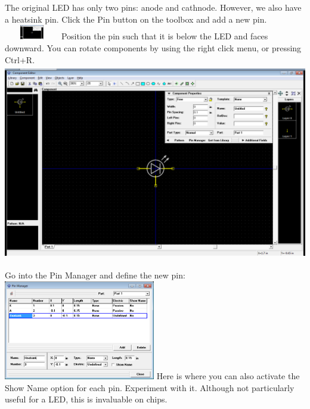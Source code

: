 \documentclass[letterpaper]{article}
\begin{document}
{\sffamily\color[rgb]{0.30980393,0.5058824,0.7411765}
The original LED has only two pins: anode and cathnode. However, we also have a heatsink pin. Click the
{\textquotedbl}Pin{\textquotedbl} button on the toolbox and add a new pin.\newline
 \includegraphics[width=0.9402in,height=0.252in]{figures/ee4document-img043.png} \newline
Position the pin such that it is below the LED and faces downward. You can rotate components by using the right click
menu, or pressing Ctrl+R.\newline
 \includegraphics[width=5.4in,height=3.3665in]{figures/ee4document-img044.png} }

{\sffamily\color[rgb]{0.30980393,0.5058824,0.7411765}
Go into the Pin Manager and define the new pin:\newline
 \includegraphics[width=2.6043in,height=1.7126in]{figures/ee4document-img045.png} \newline
Here is where you can also activate the {\textquotedbl}Show Name{\textquotedbl} option for each pin. Experiment with it.
Although not particularly useful for a LED, this is invaluable on chips.}
\end{document}
